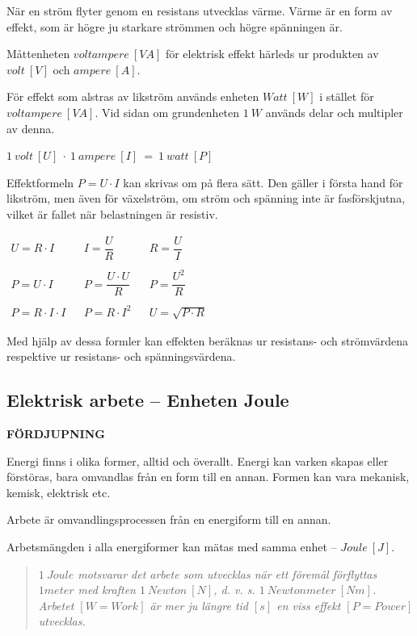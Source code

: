 När en ström flyter genom en resistans utvecklas värme. Värme är en form av
effekt, som är högre ju starkare strömmen och högre spänningen är.

Måttenheten \(voltampere\ [VA]\) för elektrisk effekt härleds ur produkten av
\(volt\ [V]\) och \(ampere\ [A]\).

För effekt som alstras av likström används enheten \(Watt\ [W]\) i stället för
\(voltampere\ [VA]\). Vid sidan om grundenheten \(1\ W\) används delar och
multipler av denna.

\(1\ volt\ [U]\ \cdot\ 1\ ampere\ [I]\ =\ 1\ watt\ [P]\)

Effektformeln \(P = U \cdot I\) kan skrivas om på flera sätt. Den gäller i första
hand för likström, men även för växelström, om ström och spänning inte är
fasförskjutna, vilket är fallet när belastningen är resistiv.

\(
\begin{array}{lllll}
U = R \cdot I & & I = \dfrac{U}{R} & & R = \dfrac{U}{I}\\ \\
P = U \cdot I & & P = \dfrac{U \cdot U }{R} & & P = \dfrac{U^2}{R}\\ \\
P = R \cdot I \cdot I & & P = R \cdot I^2 & & U = \sqrt{P \cdot R}
\end{array}
\)

Med hjälp av dessa formler kan effekten beräknas ur resistans- och strömvärdena
respektive ur resistans- och spänningsvärdena.

\subsection{Elektrisk arbete -- Enheten Joule}
\textbf{FÖRDJUPNING}

Energi finns i olika former, alltid och överallt. Energi kan varken skapas
eller förstöras, bara omvandlas från en form till en annan. Formen kan vara
mekanisk, kemisk, elektrisk etc.

Arbete är omvandlingsprocessen från en energiform till en annan.

Arbetsmängden i alla energiformer kan mätas med samma enhet -- \(Joule\ [J]\).

\begin{quote}\emph{
\(1\ Joule\) motsvarar det arbete som utvecklas när ett föremål förflyttas
\(1 meter\) med kraften \(1\ Newton\ [N]\), d. v. s. \(1\ Newtonmeter\ [Nm]\).
Arbetet \([W=Work]\) är mer ju längre tid \([s]\) en viss effekt \([P=Power]\)
utvecklas.
}\end{quote}

